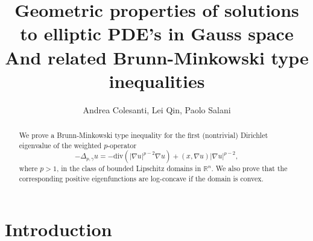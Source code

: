 \documentclass[12pt]{amsart}
\newcommand{\R}{\mathbb R}
\newcommand{\1}{\mathbf 1}
\begin{document}
\title[]{
Geometric properties of solutions to elliptic PDE's in Gauss space\\
And related Brunn-Minkowski type inequalities}
\author[Andrea Colesanti, Lei Qin, Paolo Salani ]{Andrea Colesanti, Lei Qin, Paolo Salani}
\address{Dipartimento di Matematica e Informatica ``U. Dini", Universit\`a degli Studi di Firenze}
\address{Institute of Mathematics,
Hunan University, Changsha, 410082, China}
\address{Dipartimento di Matematica e Informatica ``U. Dini", Universit\`a degli Studi di Firenze}


\begin{abstract}
We prove a Brunn-Minkowski type inequality for the first (nontrivial) Dirichlet eigenvalue of the weighted $p$-operator
\[
-\Delta_{p,\gamma}u=-\text{div}(|\nabla u|^{p-2} \nabla u)+(x,\nabla u)|\nabla u|^{p-2},
\]
where $p>1$, in the class of bounded Lipschitz domains in $\R^n$. We also prove that the corresponding positive eigenfunctions are log-concave if the domain is convex.
\end{abstract}

\maketitle
\baselineskip18pt

\parskip3pt
\section{Introduction}
\end{document}
